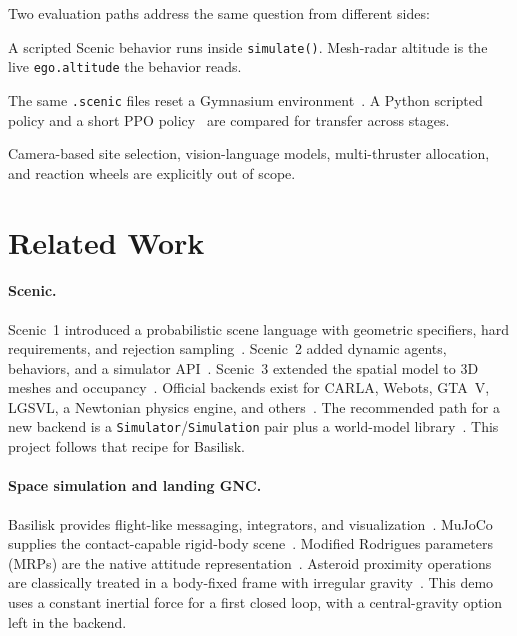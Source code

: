 \documentclass[10pt]{article}
\begin{document}
Two evaluation paths address the same question from different sides:
\begin{description}[leftmargin=1.1em,style=nextline]
  \item[Path A --- Scenic-native.]
    A scripted Scenic behavior runs inside \texttt{simulate()}.
    Mesh-radar altitude is the live \texttt{ego.altitude} the behavior reads.
  \item[Path B --- Gym curriculum.]
    The same \texttt{.scenic} files reset a Gymnasium environment~\citep{towers2024gymnasium}.
    A Python scripted policy and a short PPO policy~\citep{schulman2017ppo,raffin2021sb3} are compared for transfer across stages.
\end{description}
Camera-based site selection, vision-language models, multi-thruster allocation, and reaction wheels are explicitly out of scope.

\section{Related Work}
\label{sec:related}

\paragraph{Scenic.}
Scenic~1 introduced a probabilistic scene language with geometric specifiers, hard requirements, and rejection sampling~\citep{fremont2019scenic}.
Scenic~2 added dynamic agents, behaviors, and a simulator API~\citep{fremont2022scenic}.
Scenic~3 extended the spatial model to 3D meshes and occupancy~\citep{vin2023scenic3}.
Official backends exist for CARLA, Webots, GTA~V, LGSVL, a Newtonian physics engine, and others~\citep{scenicdocs}.
The recommended path for a new backend is a \texttt{Simulator}/\texttt{Simulation} pair plus a world-model library~\citep{scenicdocs}.
This project follows that recipe for Basilisk.

\paragraph{Space simulation and landing GNC.}
Basilisk provides flight-like messaging, integrators, and visualization~\citep{kenneally2020basilisk}.
MuJoCo supplies the contact-capable rigid-body scene~\citep{todorov2012mujoco}.
Modified Rodrigues parameters (MRPs) are the native attitude representation~\citep{schaub1996mrp}.
Asteroid proximity operations are classically treated in a body-fixed frame with irregular gravity~\citep{scheeres2012orbital}.
This demo uses a constant inertial force for a first closed loop, with a central-gravity option left in the backend.
\end{document}
